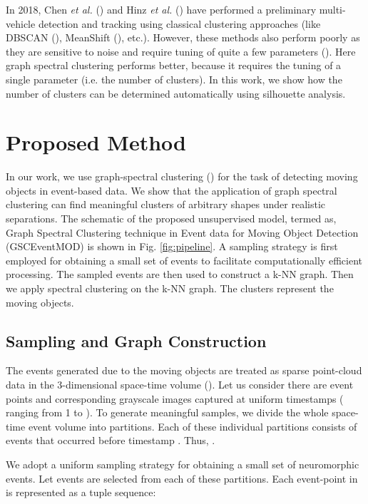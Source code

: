 \documentclass{article}
\begin{document}
In 2018, Chen \textit{et al.} (\cite{chen2018neuromorphic}) and Hinz \textit{et al.} (\cite{hinz2017online}) have performed a preliminary multi-vehicle detection and tracking using classical clustering approaches (like DBSCAN (\cite{khan2014dbscan}), MeanShift (\cite{derpanis2005mean}), etc.).
However, these methods also perform poorly as they are sensitive to noise and require tuning of quite a few parameters (\cite{feng2018robust}). Here graph spectral clustering performs better, because it requires the tuning of a single parameter (i.e. the number of clusters). In this work, we show how the number of clusters can be determined automatically using silhouette analysis.

\section{Proposed Method}
In our work, we use graph-spectral clustering (\cite{luo2003spectral,martin2018robust}) for the task of detecting moving objects in event-based data. We show that the application of graph spectral clustering can find meaningful clusters of arbitrary shapes under realistic separations. The schematic of the proposed unsupervised model, termed as, Graph Spectral Clustering technique in Event data for Moving Object Detection (GSCEventMOD) is shown in Fig. \ref{fig:pipeline}. A sampling strategy is first employed for obtaining a small set of events to facilitate computationally efficient processing. The sampled events are then used to construct a k-NN graph. Then we apply spectral clustering on the k-NN graph. The clusters represent the moving objects. 


\subsection{Sampling and Graph Construction}
The events generated due to the moving objects are treated as sparse point-cloud data in the 3-dimensional space-time volume (\cite{chen2020event}). Let us consider there are  event points and corresponding  grayscale images captured at uniform timestamps  ( ranging from 1 to ). To generate meaningful samples, we divide the whole space-time event volume into  partitions. Each of these individual partitions consists of  events that occurred before timestamp . Thus, . 

We adopt a uniform sampling strategy for obtaining a small set of neuromorphic events. Let  events are selected from each of these partitions. Each event-point in  is represented as a tuple sequence:
\end{document}
